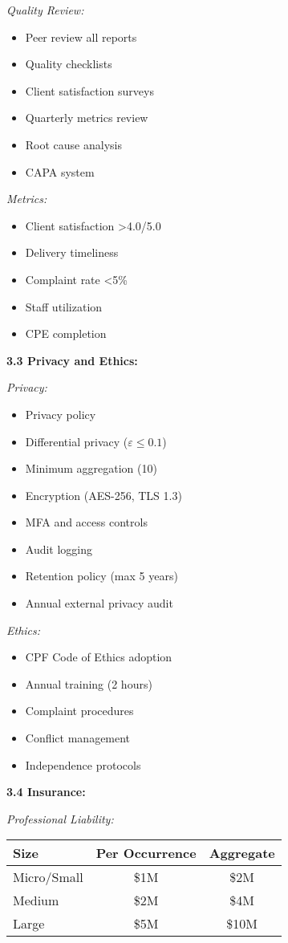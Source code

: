 \documentclass[11pt,a4paper]{article}
\begin{document}
\textit{Quality Review:}
\begin{itemize}
\item Peer review all reports
\item Quality checklists
\item Client satisfaction surveys
\item Quarterly metrics review
\item Root cause analysis
\item CAPA system
\end{itemize}

\textit{Metrics:}
\begin{itemize}
\item Client satisfaction >4.0/5.0
\item Delivery timeliness
\item Complaint rate <5\%
\item Staff utilization
\item CPE completion
\end{itemize}

\textbf{3.3 Privacy and Ethics:}

\textit{Privacy:}
\begin{itemize}
\item Privacy policy
\item Differential privacy ($\varepsilon \leq 0.1$)
\item Minimum aggregation (10)
\item Encryption (AES-256, TLS 1.3)
\item MFA and access controls
\item Audit logging
\item Retention policy (max 5 years)
\item Annual external privacy audit
\end{itemize}

\textit{Ethics:}
\begin{itemize}
\item CPF Code of Ethics adoption
\item Annual training (2 hours)
\item Complaint procedures
\item Conflict management
\item Independence protocols
\end{itemize}

\textbf{3.4 Insurance:}

\textit{Professional Liability:}

\begin{tabular}{|l|c|c|}
\hline
Size & Per Occurrence & Aggregate \\
\hline
Micro/Small & \$1M & \$2M \\
Medium & \$2M & \$4M \\
Large & \$5M & \$10M \\
\hline
\end{tabular}
\end{document}
